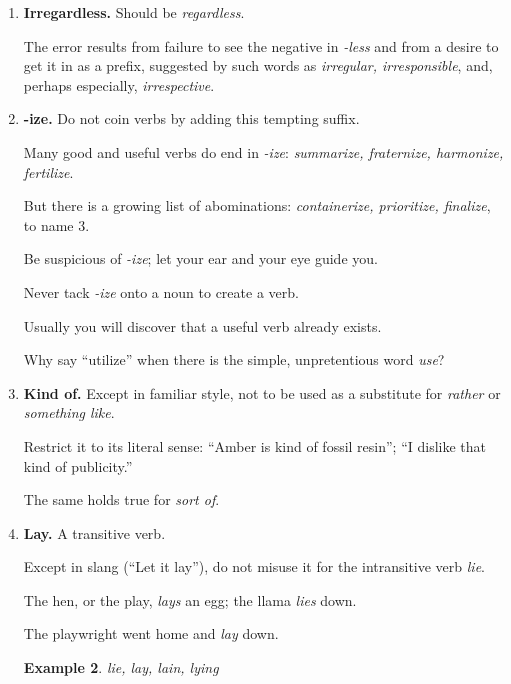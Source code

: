 \documentclass{article}
\newtheorem{example}{Example}
\begin{document}
\begin{enumerate}
	Instead of announcing that what you are about to tell is interesting, make it so.
	\begin{example}
		An interesting story is told of $\to$ (Tell the story without preamble.)
		
		In connection with the forthcoming visit of Mr. B. to America, it is interesting to recall that he
		
		$\to$ Mr. B., who will soon visit America
	\end{example}
	Also to be avoided in introduction is the word {\it funny}.
	
	Nothing becomes funny by being labeled so.
	\item {\bf Irregardless.} Should be {\it regardless}.
	
	The error results from failure to see the negative in {\it -less} and from a desire to get it in as a prefix, suggested by such words as {\it irregular, irresponsible}, and, perhaps especially, {\it irrespective}.
	\item {\bf -ize.} Do not coin verbs by adding this tempting suffix.
	
	Many good and useful verbs do end in {\it -ize}: {\it summarize, fraternize, harmonize, fertilize}.
	
	But there is a growing list of abominations: {\it containerize, prioritize, finalize}, to name 3.
	
	Be suspicious of {\it -ize}; let your ear and your eye guide you.
	
	Never tack {\it -ize} onto a noun to create a verb.
	
	Usually you will discover that a useful verb already exists.
	
	Why say ``utilize'' when there is the simple, unpretentious word {\it use}?
	\item {\bf Kind of.} Except in familiar style, not to be used as a substitute for {\it rather} or {\it something like}.
	
	Restrict it to its literal sense: ``Amber is kind of fossil resin''; ``I dislike that kind of publicity.''
	
	The same holds true for {\it sort of}.
	\item {\bf Lay.} A transitive verb.
	
	Except in slang (``Let it lay''), do not misuse it for the intransitive verb {\it lie}.
	
	The hen, or the play, {\it lays} an egg; the llama {\it lies} down.
	
	The playwright went home and {\it lay} down.
	\begin{example}
		lie, lay, lain, lying
		

\end{example}
\end{enumerate}
\end{document}
